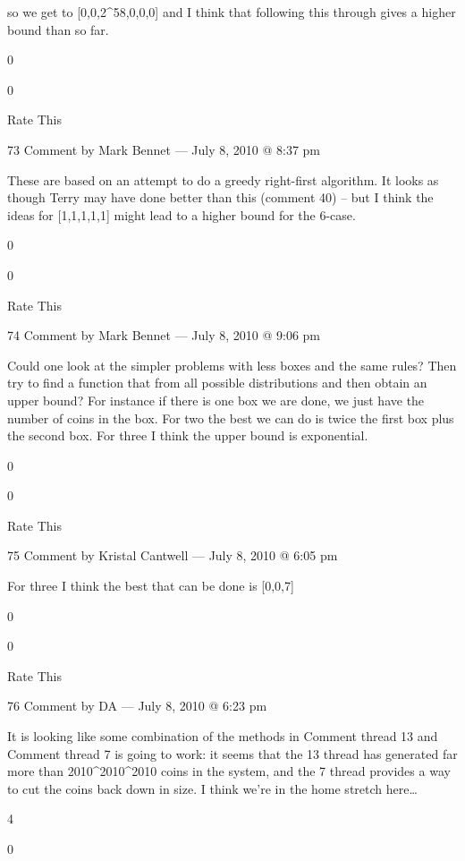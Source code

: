             so we get to [0,0,2^58,0,0,0] and I think that following this through gives a higher bound than so far.
             
            0
             
            0
             
            Rate This

            73 Comment by Mark Bennet — July 8, 2010 @ 8:37 pm

                These are based on an attempt to do a greedy right-first algorithm. It looks as though Terry may have done better than this (comment 40) – but I think the ideas for [1,1,1,1,1] might lead to a higher bound for the 6-case.
                 
                0
                 
                0
                 
                Rate This

                74 Comment by Mark Bennet — July 8, 2010 @ 9:06 pm

    Could one look at the simpler problems with less boxes and the same rules? Then try to find a function that from all possible distributions and then obtain an upper bound? For instance if there is one box we are done, we just have the number of coins in the box. For two the best we can do is twice the first box plus the second box. For three I think the upper bound is exponential.
     
    0
     
    0
     
    Rate This

    75 Comment by Kristal Cantwell — July 8, 2010 @ 6:05 pm

        For three I think the best that can be done is [0,0,7]
         
        0
         
        0
         
        Rate This

        76 Comment by DA — July 8, 2010 @ 6:23 pm

    It is looking like some combination of the methods in Comment thread 13 and Comment thread 7 is going to work: it seems that the 13 thread has generated far more than 2010^{2010^{2010}} coins in the system, and the 7 thread provides a way to cut the coins back down in size. I think we’re in the home stretch here…
     
    4
     
    0
     
